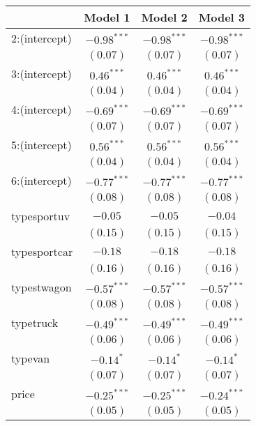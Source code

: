 
\begin{table}
\tiny
\begin{center}
\begin{tabular}{l c c c }
\hline
 & Model 1 & Model 2 & Model 3 \\
\hline
2:(intercept)      & $-0.98^{***}$ & $-0.98^{***}$ & $-0.98^{***}$ \\
                   & $(0.07)$      & $(0.07)$      & $(0.07)$      \\
3:(intercept)      & $0.46^{***}$  & $0.46^{***}$  & $0.46^{***}$  \\
                   & $(0.04)$      & $(0.04)$      & $(0.04)$      \\
4:(intercept)      & $-0.69^{***}$ & $-0.69^{***}$ & $-0.69^{***}$ \\
                   & $(0.07)$      & $(0.07)$      & $(0.07)$      \\
5:(intercept)      & $0.56^{***}$  & $0.56^{***}$  & $0.56^{***}$  \\
                   & $(0.04)$      & $(0.04)$      & $(0.04)$      \\
6:(intercept)      & $-0.77^{***}$ & $-0.77^{***}$ & $-0.77^{***}$ \\
                   & $(0.08)$      & $(0.08)$      & $(0.08)$      \\
typesportuv        & $-0.05$       & $-0.05$       & $-0.04$       \\
                   & $(0.15)$      & $(0.15)$      & $(0.15)$      \\
typesportcar       & $-0.18$       & $-0.18$       & $-0.18$       \\
                   & $(0.16)$      & $(0.16)$      & $(0.16)$      \\
typestwagon        & $-0.57^{***}$ & $-0.57^{***}$ & $-0.57^{***}$ \\
                   & $(0.08)$      & $(0.08)$      & $(0.08)$      \\
typetruck          & $-0.49^{***}$ & $-0.49^{***}$ & $-0.49^{***}$ \\
                   & $(0.06)$      & $(0.06)$      & $(0.06)$      \\
typevan            & $-0.14^{*}$   & $-0.14^{*}$   & $-0.14^{*}$   \\
                   & $(0.07)$      & $(0.07)$      & $(0.07)$      \\
price              & $-0.25^{***}$ & $-0.25^{***}$ & $-0.24^{***}$ \\
                   & $(0.05)$      & $(0.05)$      & $(0.05)$      \\

\end{tabular}
\end{center}
\end{table}
